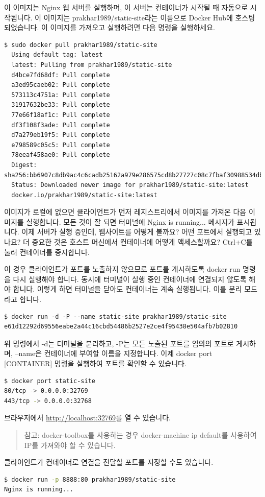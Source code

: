 이 이미지는 Nginx 웹 서버를 실행하며, 이 서버는 컨테이너가 시작될 때 자동으로 시작됩니다. 이 이미지는 prakhar1989/static-site라는 이름으로 Docker Hub에 호스팅되었습니다. 이 이미지를 가져오고 실행하려면 다음 명령을 실행하세요.
\begin{lstlisting}[language=Shell]
  $ sudo docker pull prakhar1989/static-site
  Using default tag: latest
  latest: Pulling from prakhar1989/static-site
  d4bce7fd68df: Pull complete 
  a3ed95caeb02: Pull complete 
  573113c4751a: Pull complete 
  31917632be33: Pull complete 
  77e66f18af1c: Pull complete 
  df3f108f3ade: Pull complete 
  d7a279eb19f5: Pull complete 
  e798589c05c5: Pull complete 
  78eeaf458ae0: Pull complete 
  Digest: sha256:bb6907c8db9ac4c6cadb25162a979e286575cd8b27727c08c7fbaf30988534db
  Status: Downloaded newer image for prakhar1989/static-site:latest
  docker.io/prakhar1989/static-site:latest
\end{lstlisting}

이미지가 로컬에 없으면 클라이언트가 먼저 레지스트리에서 이미지를 가져온 다음 이미지를 실행합니다. 모든 것이 잘 되면 터미널에 Nginx is running... 메시지가 표시됩니다. 이제 서버가 실행 중인데, 웹사이트를 어떻게 볼까요? 어떤 포트에서 실행되고 있나요? 더 중요한 것은 호스트 머신에서 컨테이너에 어떻게 액세스할까요? Ctrl+C를 눌러 컨테이너를 중지합니다.

이 경우 클라이언트가 포트를 노출하지 않으므로 포트를 게시하도록 docker run 명령을 다시 실행해야 합니다. 동시에 터미널이 실행 중인 컨테이너에 연결되지 않도록 해야 합니다. 이렇게 하면 터미널을 닫아도 컨테이너는 계속 실행됩니다. 이를 분리 모드라고 합니다.
\begin{lstlisting}[language=Shell]
$ docker run -d -P --name static-site prakhar1989/static-site
e61d12292d69556eabe2a44c16cbd54486b2527e2ce4f95438e504afb7b02810
\end{lstlisting}

위 명령에서 -d는 터미널을 분리하고, -P는 모든 노출된 포트를 임의의 포트로 게시하며, --name은 컨테이너에 부여할 이름을 지정합니다. 이제 docker port [CONTAINER] 명령을 실행하여 포트를 확인할 수 있습니다.
\begin{lstlisting}[language=bash]
$ docker port static-site
80/tcp -> 0.0.0.0:32769
443/tcp -> 0.0.0.0:32768
\end{lstlisting}

브라우저에서 \url{http://localhost:32769}를 열 수 있습니다.
\begin{quote}
참고: docker-toolbox를 사용하는 경우 docker-machine ip default를 사용하여 IP를 가져와야 할 수 있습니다.
\end{quote}
클라이언트가 컨테이너로 연결을 전달할 포트를 지정할 수도 있습니다.
\begin{lstlisting}[language=bash]
$ docker run -p 8888:80 prakhar1989/static-site
Nginx is running...
\end{lstlisting}

